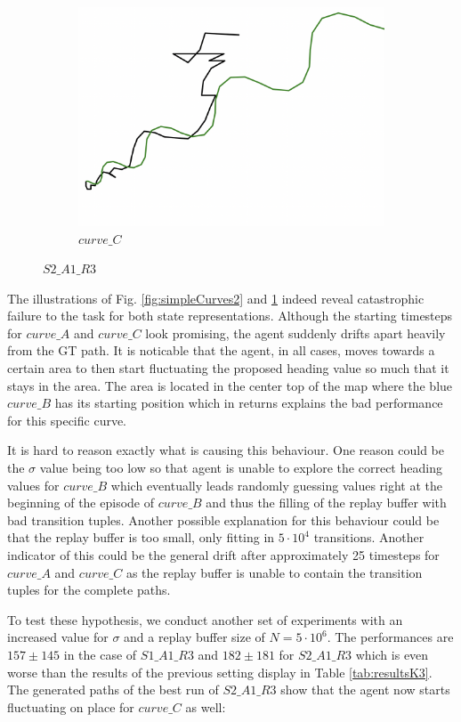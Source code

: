 \begin{figure}[H]
\begin{subfigure}[b]{0.31\textwidth}
         \includegraphics[width=\textwidth]{images/ddpg_results/simple_envs_S1_S2/S2_A1_R3_K3_curve_C.png}
         \caption{$curve\_C$}
     \end{subfigure}
        \caption{$S2\_A1\_R3$}
        \label{fig:simpleCurves3}
\end{figure}

The illustrations of Fig. \ref{fig:simpleCurves2} and \ref{fig:simpleCurves3} indeed reveal catastrophic failure to the task for both state representations. Although the starting timesteps for $curve\_A$ and $curve\_C$ look promising, the agent suddenly drifts apart heavily from the GT path. It is noticable that the agent, in all cases, moves towards a certain area to then start fluctuating the proposed heading value so much that it stays in the area. The area is located in the center top of the map where the blue $curve\_B$ has its starting position which in returns explains the bad performance for this specific curve. 
\par
It is hard to reason exactly what is causing this behaviour. One reason could be the $\sigma$ value being too low so that agent is unable to explore the correct heading values for $curve\_B$ which eventually leads randomly guessing values right at the beginning of the episode of $curve\_B$ and thus the filling of the replay buffer with bad transition tuples. Another possible explanation for this behaviour could be that the replay buffer is too small, only fitting in $5\cdot 10^4$ transitions. Another indicator of this could be the general drift after approximately 25 timesteps for $curve\_A$ and $curve\_C$ as the replay buffer is unable to contain the transition tuples for the complete paths.
\par
To test these hypothesis, we conduct another set of experiments with an increased value for $\sigma$ and a replay buffer size of $N=5\cdot 10^6$. The performances are $157 \pm 145$ in the case of $S1\_A1\_R3$ and $182 \pm 181$ for $S2\_A1\_R3$ which is even worse than the results of the previous setting display in Table \ref{tab:resultsK3}. The generated paths of the best run of $S2\_A1\_R3$ show that the agent now starts fluctuating on place for $curve\_C$ as well:

